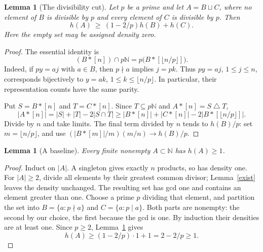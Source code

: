 \documentclass[11pt]{article}
\newtheorem{lemma}[theorem]{Lemma}
\newcommand{\N}{\mathbb N}
\begin{document}
\begin{lemma}[The divisibility cut]\label{cut}
Let \(p\) be a prime and let \(A=B\sqcup C\), where no element of \(B\)
is divisible by \(p\) and every element of \(C\) is divisible by \(p\).
Then
\[
h(A)\ \ge\ (1-2/p)h(B)+h(C).
\]
Here the empty set may be assigned density zero.
\end{lemma}
\begin{proof}
The essential identity is
\[
(B*[n])\cap p\N=p\bigl(B*[\lfloor n/p\rfloor]\bigr).
\]
Indeed, if \(py=aj\) with \(a\in B\), then \(p\nmid a\) implies \(j=pk\).
Thus \(py=aj\), \(1\le j\le n\), corresponds bijectively to
\(y=ak\), \(1\le k\le\lfloor n/p\rfloor\). In particular, their
representation counts have the same parity.

Put \(S=B*[n]\) and \(T=C*[n]\). Since \(T\subseteq p\N\) and
\(A*[n]=S\mathbin{\triangle}T\),
\[
|A*[n]|=|S|+|T|-2|S\cap T|
\ge |B*[n]|+|C*[n]|-2|B*[\lfloor n/p\rfloor]|.
\]
Divide by \(n\) and take limits. The final term divided by \(n\)
tends to \(h(B)/p\): set \(m=\lfloor n/p\rfloor\), and use
\((|B*[m]|/m)(m/n)\to h(B)/p\).
\end{proof}

\begin{lemma}[A baseline]\label{baseline}
Every finite nonempty \(A\subset\N\) has \(h(A)\ge1\).
\end{lemma}
\begin{proof}
Induct on \(|A|\). A singleton gives exactly \(n\) products, so has density one.
For \(|A|\ge2\), divide all elements by their greatest common divisor;
Lemma~\ref{exist} leaves the density unchanged. The resulting set has gcd one
and contains an element greater than one. Choose a prime \(p\) dividing that
element, and partition the set into \(B=\{a:p\nmid a\}\) and \(C=\{a:p\mid a\}\).
Both parts are nonempty: the second by our choice, the first because the gcd
is one. By induction their densities are at least one. Since \(p\ge2\),
Lemma~\ref{cut} gives
\[
h(A)\ge(1-2/p)\cdot1+1=2-2/p\ge1.
\]
\end{proof}
\end{document}
